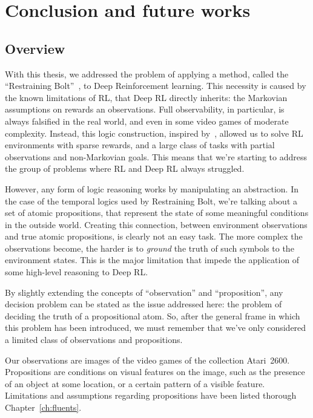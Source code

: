 \chapter{Conclusion and future works}

\label{ch:conclusions}


\section{Overview}

With this thesis, we addressed the problem of applying a method, called the
``Restraining Bolt''~\cite{bib:bolt}, to Deep Reinforcement learning. This
necessity is caused by the known limitations of RL, that Deep RL directly
inherits: the Markovian assumptions on rewards an observations. Full
observability, in particular, is always falsified in the real world, and even
in some video games of moderate complexity. Instead, this logic construction,
inspired by~\cite{bib:nmrdp-logic-first}, allowed us to solve RL environments
with sparse rewards, and a large class of tasks with partial observations and
non-Markovian goals. This means that we're starting to address the group of
problems where RL and Deep RL always struggled.

However, any form of logic reasoning works by manipulating an abstraction. In
the case of the temporal logics used by Restraining Bolt, we're talking about
a set of atomic propositions, that represent the state of some meaningful
conditions in the outside world. Creating this connection, between environment
observations and true atomic propositions, is clearly not an easy task. The
more complex the observations become, the harder is to \emph{ground} the truth
of such symbols to the environment states. This is the major limitation that
impede the application of some high-level reasoning to Deep RL.

By slightly extending the concepts of ``observation'' and ``proposition'',
any decision problem can be stated as the issue addressed here: the problem of
deciding the truth of a propositional atom. So, after the general frame in
which this problem has been introduced, we must remember that we've only
considered a limited class of observations and propositions.

Our observations are images of the video games of the collection Atari~2600.
Propositions are conditions on visual features on the image, such as the
presence of an object at some location, or a certain pattern of a visible
feature. Limitations and assumptions regarding propositions have been listed
thorough Chapter~\ref{ch:fluents}.
\enlargethispage{1\baselineskip}



